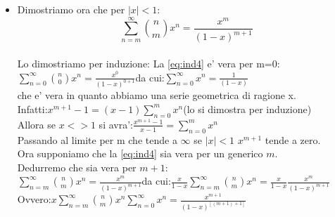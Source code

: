 \documentclass[12pt,a4paper]{article}
\begin{document}
\begin{flushleft}
\begin{itemize}
{}
\item{
Dimostriamo ora che per $|x|<1$:\\
\begin{equation}
\label{eq:ind4}
\sum_{n=m}^{\infty}{}\binom{n}{m}x^n=\frac{x^{m}}{(1-x)^{m+1}}
\end{equation}
\\
\vspace{5mm}
Lo dimostriamo per induzione:
\vspace{5mm}
La \eqref{eq:ind4} e' vera per m=0:\hspace{14mm}$\sum_{n=0}^{\infty}{}\binom{n}{0}x^n=\frac{x^{0}}{(1-x)^{0+1}}$\hspace{10mm}da cui:\hspace{10mm}$\sum_{n=0}^{\infty}{}x^n=\frac{1}{(1-x)}$\\
\vspace{5mm}
che e' vera in quanto abbiamo una serie geometrica di ragione x.\\
\vspace{5mm}
Infatti:\hspace{10mm}$x^{m+1}-1=(x-1)\sum_{n=0}^{m}{x^n}$\hspace{5mm}(lo si dimostra per induzione)\\
\vspace{5mm}
Allora se $x<>1$ si avra':\hspace{10mm}$\frac{x^{m+1}-1}{x-1}=\sum_{n=0}^{m}{x^{n}}$\\
\vspace{5mm}
Passando al limite per m che tende a $\infty$ se $|x|<1$ $x^{m+1}$ tende a zero.\\
\vspace{5mm}
Ora supponiamo che la \eqref{eq:ind4} sia vera per un generico $m$.\\
\vspace{5mm}
Dedurremo che sia vera per $m+1$:\\
\vspace{5mm}
$\sum_{n=m}^{\infty}{}\binom{n}{m}x^n=\frac{x^{m}}{(1-x)^{m+1}}$\hspace{5mm}da cui:\hspace{5mm}$\frac{x}{1-x}\sum_{n=m}^{\infty}{}\binom{n}{m}x^n=\frac{x}{1-x}\frac{x^{m}}{(1-x)^{m+1}}$\\
\vspace{5mm}
Ovvero:\hspace{5mm}$x\sum_{n=m}^{\infty}{}\binom{n}{m}x^n\sum_{n=0}^{\infty}{x^n}=\frac{x^{m+1}}{(1-x)^{[(m+1)+1]}}$\\
\vspace{5mm}
}
\end{itemize}
\end{flushleft}
\end{document}
